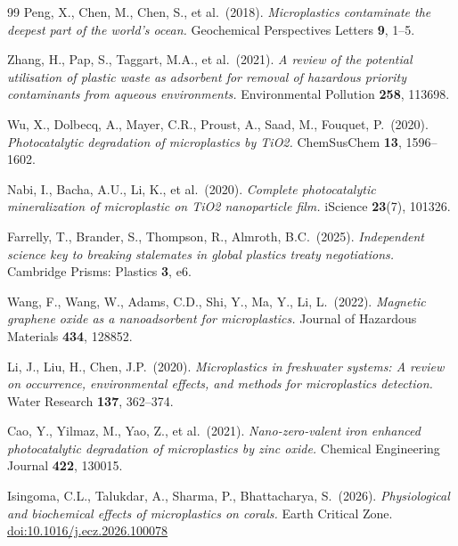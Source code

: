 ﻿\documentclass[12pt,a4paper]{article}
\theoremstyle{definition}
\theoremstyle{remark}
\begin{document}
\begin{thebibliography}{99}
Peng, X., Chen, M., Chen, S., et al.\ (2018).
\textit{Microplastics contaminate the deepest part of the world's ocean.}
Geochemical Perspectives Letters \textbf{9}, 1--5.

Zhang, H., Pap, S., Taggart, M.A., et al.\ (2021).
\textit{A review of the potential utilisation of plastic waste as
adsorbent for removal of hazardous priority contaminants from aqueous
environments.}
Environmental Pollution \textbf{258}, 113698.

Wu, X., Dolbecq, A., Mayer, C.R., Proust, A., Saad, M., Fouquet, P.\ (2020).
\textit{Photocatalytic degradation of microplastics by TiO2.}
ChemSusChem \textbf{13}, 1596--1602.

Nabi, I., Bacha, A.U., Li, K., et al.\ (2020).
\textit{Complete photocatalytic mineralization of microplastic
on TiO2 nanoparticle film.}
iScience \textbf{23}(7), 101326.

Farrelly, T., Brander, S., Thompson, R., Almroth, B.C.\ (2025).
\textit{Independent science key to breaking stalemates in global
plastics treaty negotiations.}
Cambridge Prisms: Plastics \textbf{3}, e6.

Wang, F., Wang, W., Adams, C.D., Shi, Y., Ma, Y., Li, L.\ (2022).
\textit{Magnetic graphene oxide as a nanoadsorbent for microplastics.}
Journal of Hazardous Materials \textbf{434}, 128852.

Li, J., Liu, H., Chen, J.P.\ (2020).
\textit{Microplastics in freshwater systems: A review on occurrence,
environmental effects, and methods for microplastics detection.}
Water Research \textbf{137}, 362--374.

Cao, Y., Yilmaz, M., Yao, Z., et al.\ (2021).
\textit{Nano-zero-valent iron enhanced photocatalytic degradation
of microplastics by zinc oxide.}
Chemical Engineering Journal \textbf{422}, 130015.

Isingoma, C.L., Talukdar, A., Sharma, P., Bhattacharya, S.\ (2026).
\textit{Physiological and biochemical effects of microplastics on corals.}
Earth Critical Zone.
\href{https://doi.org/10.1016/j.ecz.2026.100078}{doi:10.1016/j.ecz.2026.100078}

\end{thebibliography}
\end{document}

